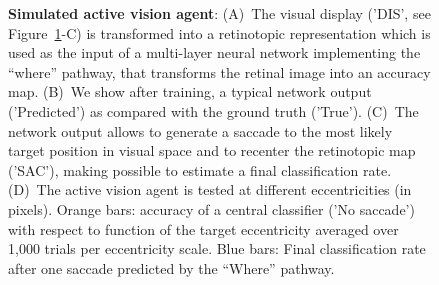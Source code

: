 \begin{figure}[t!]%
\caption{
{\bf Simulated active vision agent}:
(A)~The visual display ('DIS', see  Figure~\ref{fig:results}-C)  is transformed into a retinotopic representation which is used as the input of a multi-layer neural network implementing the ``where'' pathway, that transforms the retinal image into an accuracy map. (B)~We show after training, a typical network output  ('Predicted') as compared  with the ground truth ('True'). (C)~The network output allows to generate a saccade to the most likely target position in visual space and to recenter the retinotopic map ('SAC'), making possible to estimate a final classification rate. (D)~The active vision agent is tested at different eccentricities (in pixels). Orange bars: accuracy of a central classifier ('No saccade') with respect to  function of the target eccentricity averaged over 1,000 trials per eccentricity scale. Blue bars: Final classification rate after one saccade predicted by the ``Where'' pathway.
\label{fig:results}}%
\end{figure}%
%
